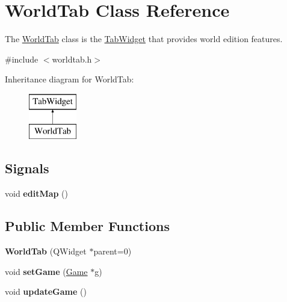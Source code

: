 \hypertarget{class_world_tab}{\section{\-World\-Tab \-Class \-Reference}
\label{class_world_tab}
}


\-The \hyperlink{class_world_tab}{\-World\-Tab} class is the \hyperlink{class_tab_widget}{\-Tab\-Widget} that provides world edition features.  




{\ttfamily \#include $<$worldtab.\-h$>$}

\-Inheritance diagram for \-World\-Tab\-:\begin{figure}[H]
\begin{center}
\leavevmode
\includegraphics[height=2.000000cm]{class_world_tab}
\end{center}
\end{figure}
\subsection*{\-Signals}
\begin{DoxyCompactItemize}
\item 
\hypertarget{class_world_tab_a57d3f7150343d03ef60502ebccecd622}{void {\bfseries edit\-Map} ()}\label{class_world_tab_a57d3f7150343d03ef60502ebccecd622}

\end{DoxyCompactItemize}
\subsection*{\-Public \-Member \-Functions}
\begin{DoxyCompactItemize}
\item 
\hypertarget{class_world_tab_a8ad97800dd89af4ee32f97823b67ca8e}{{\bfseries \-World\-Tab} (\-Q\-Widget $\ast$parent=0)}\label{class_world_tab_a8ad97800dd89af4ee32f97823b67ca8e}

\item 
\hypertarget{class_world_tab_ae37b09116218cfcc9b1f184eb88a59ee}{void {\bfseries set\-Game} (\hyperlink{class_game}{\-Game} $\ast$g)}\label{class_world_tab_ae37b09116218cfcc9b1f184eb88a59ee}

\item 
\hypertarget{class_world_tab_a772ecbc80ab9edae07fd20ad032a4cd7}{void {\bfseries update\-Game} ()}\label{class_world_tab_a772ecbc80ab9edae07fd20ad032a4cd7}

\end{DoxyCompactItemize}



